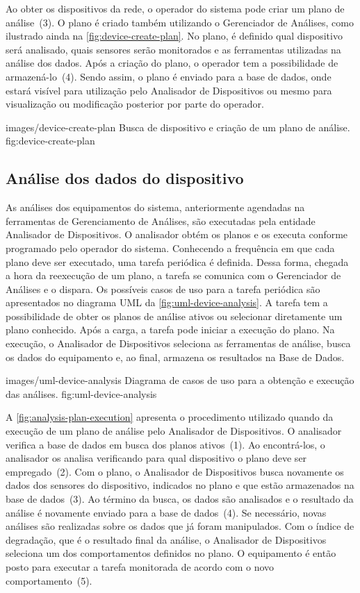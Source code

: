 Ao obter os dispositivos da rede, o operador do sistema pode criar um plano de análise~(3). O plano
é criado também utilizando o Gerenciador de Análises, como ilustrado ainda na
\cref{fig:device-create-plan}. No plano, é definido qual dispositivo será analisado, quais sensores
serão monitorados e as ferramentas utilizadas na análise dos dados. Após a criação do plano, o
operador tem a possibilidade de armazená-lo~(4). Sendo assim, o plano é enviado para a base de
dados, onde estará visível para utilização pelo Analisador de Dispositivos ou mesmo para
visualização ou modificação posterior por parte do operador.

  {images/device-create-plan}
  {Busca de dispositivo e criação de um plano de análise.}
  {fig:device-create-plan}


\subsection{Análise dos dados do dispositivo}

As análises dos equipamentos do sistema, anteriormente agendadas na ferramentas de Gerenciamento de
Análises, são executadas pela entidade Analisador de Dispositivos. O analisador obtém os planos e os
executa conforme programado pelo operador do sistema. Conhecendo a frequência em que cada plano deve
ser executado, uma tarefa periódica é definida. Dessa forma, chegada a hora da reexecução de um
plano, a tarefa se comunica com o Gerenciador de Análises e o dispara. Os possíveis casos de uso
para a tarefa periódica são apresentados no diagrama \gls{UML} da \cref{fig:uml-device-analysis}. A
tarefa tem a possibilidade de obter os planos de análise ativos ou selecionar diretamente um plano
conhecido. Após a carga, a tarefa pode iniciar a execução do plano. Na execução, o Analisador de
Dispositivos seleciona as ferramentas de análise, busca os dados do equipamento e, ao final,
armazena os resultados na Base de Dados.

  {images/uml-device-analysis}
  {Diagrama de casos de uso para a obtenção e execução das análises.}
  {fig:uml-device-analysis}

A \cref{fig:analysis-plan-execution} apresenta o procedimento utilizado quando da execução de um
plano de análise pelo Analisador de Dispositivos. O analisador verifica a base de dados em busca dos
planos ativos~(1). Ao encontrá-los, o analisador os analisa verificando para qual dispositivo o
plano deve ser empregado~(2). Com o plano, o Analisador de Dispositivos busca novamente os dados dos
sensores do dispositivo, indicados no plano e que estão armazenados na base de dados~(3). Ao término
da busca, os dados são analisados e o resultado da análise é novamente enviado para a base de
dados~(4). Se necessário, novas análises são realizadas sobre os dados que já foram manipulados. Com
o índice de degradação, que é o resultado final da análise, o Analisador de Dispositivos seleciona
um dos comportamentos definidos no plano. O equipamento é então posto para executar a tarefa
monitorada de acordo com o novo comportamento~(5).

